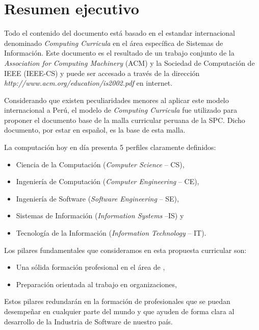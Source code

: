 \chapter*{Resumen ejecutivo}
\AbstractIntro

Todo el contenido del documento está basado en el estandar internacional denominado
\textit{Computing Curricula} en el área específica de Sistemas de Información.
Este documento es el resultado de un trabajo conjunto de la 
\textit{Association for Computing Machinery} (ACM) y la 
Sociedad de Computación de IEEE (IEEE-CS) y puede ser accesado a través de la 
dirección \textit{http://www.acm.org/education/is2002.pdf} en internet.

Considerando que existen peculiaridades menores al aplicar este modelo internacional a Perú,
el modelo de \textit{Computing Curricula} fue utilizado para proponer el documento base de 
la malla curricular peruana de la \acl{SPC}. Dicho documento, por estar en español, 
es la base de esta malla.

La computación hoy en día presenta 5 perfiles claramente definidos: 
\begin{itemize}
\item Ciencia de la Computación (\textit{Computer Science} -- CS),
\item Ingeniería de Computación (\textit{Computer Engineering} -- CE),
\item Ingeniería de Software (\textit{Software Engineering} -- SE),
\item Sistemas de Información (\textit{Information Systems} --IS) y 
\item Tecnología de la Información (\textit{Information Technology} -- IT).
\end{itemize}

Los pilares fundamentales que consideramos en esta propuesta curricular son:
\begin{itemize}
\item Una sólida formación profesional en el área de \SchoolShortName,
\item Preparación orientada al trabajo en organizaciones,
\end{itemize}

Estos pilares redundarán en la formación de profesionales que se puedan 
desempeñar en cualquier parte del mundo y que ayuden de forma clara al 
desarrollo de la Industria de Software de nuestro país.

